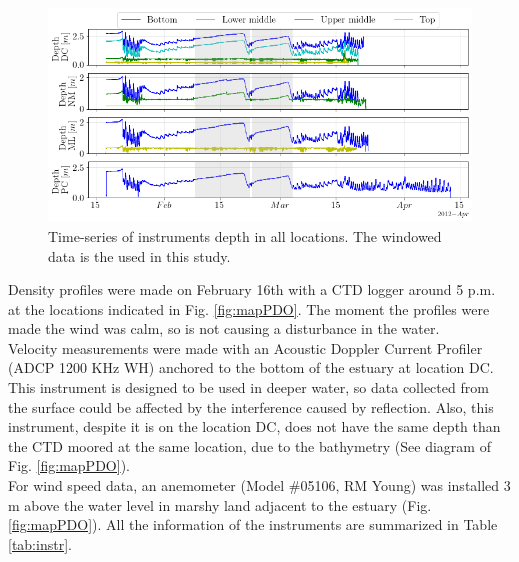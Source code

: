 \documentclass[tesis.tex]{subfiles}
\begin{document}
\begin{figure}[h!]
    \centering
    \includegraphics[width=\textwidth]{Imagenes/depth.png}
    \caption{Time-series of instruments depth in all locations. The windowed data is the used in this study.}
    \label{fig:depth}
\end{figure}

Density profiles were made on February 16th with a CTD logger around 5 p.m. at the locations indicated in Fig. \ref{fig:mapPDO}. The moment the profiles were made the wind was calm, so is not causing a disturbance in the water.\\

Velocity measurements were made with an Acoustic Doppler Current Profiler (ADCP 1200 KHz WH) anchored to the bottom of the estuary at location DC. This instrument is designed to be used in deeper water, so data collected from the surface could be affected by the interference caused by reflection. Also, this instrument, despite it is on the location DC, does not have the same depth than the CTD moored at the same location, due to the bathymetry (See diagram of Fig. \ref{fig:mapPDO}).\\

For wind speed data, an anemometer (Model $\#$05106, RM Young) was installed 3 m above the water level in marshy land adjacent to the estuary (Fig. \ref{fig:mapPDO}). All the information of the instruments are summarized in Table \ref{tab:instr}.\\
\end{document}
